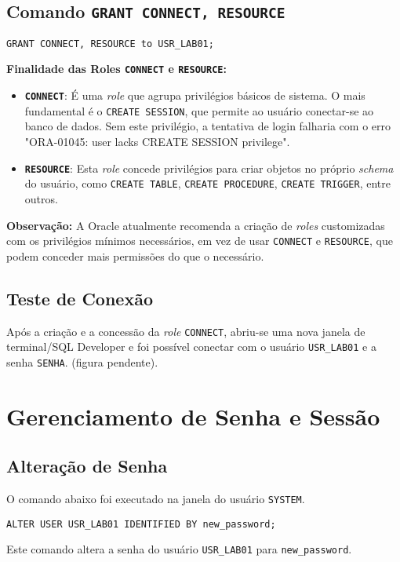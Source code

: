 \documentclass[a4paper, 12pt]{article}
\begin{document}
\subsection{Comando \texttt{GRANT CONNECT, RESOURCE}}
\begin{lstlisting}
GRANT CONNECT, RESOURCE to USR_LAB01;
\end{lstlisting}
\textbf{Finalidade das Roles \texttt{CONNECT} e \texttt{RESOURCE}:}
\begin{itemize}
    \item \textbf{\texttt{CONNECT}}: É uma \textit{role} que agrupa privilégios básicos de sistema. O mais fundamental é o \texttt{CREATE SESSION}, que permite ao usuário conectar-se ao banco de dados. Sem este privilégio, a tentativa de login falharia com o erro "ORA-01045: user lacks CREATE SESSION privilege".
    \item \textbf{\texttt{RESOURCE}}: Esta \textit{role} concede privilégios para criar objetos no próprio \textit{schema} do usuário, como \texttt{CREATE TABLE}, \texttt{CREATE PROCEDURE}, \texttt{CREATE TRIGGER}, entre outros.
\end{itemize}
\textbf{Observação:} A Oracle atualmente recomenda a criação de \textit{roles} customizadas com os privilégios mínimos necessários, em vez de usar \texttt{CONNECT} e \texttt{RESOURCE}, que podem conceder mais permissões do que o necessário.

\subsection{Teste de Conexão}
Após a criação e a concessão da \textit{role} \texttt{CONNECT}, abriu-se uma nova janela de terminal/SQL Developer e foi possível conectar com o usuário \texttt{USR\_LAB01} e a senha \texttt{SENHA}. (figura pendente).

\section{Gerenciamento de Senha e Sessão}

\subsection{Alteração de Senha}
O comando abaixo foi executado na janela do usuário \texttt{SYSTEM}.
\begin{lstlisting}
ALTER USER USR_LAB01 IDENTIFIED BY new_password;
\end{lstlisting}
Este comando altera a senha do usuário \texttt{USR\_LAB01} para \texttt{new\_password}.
\end{document}
